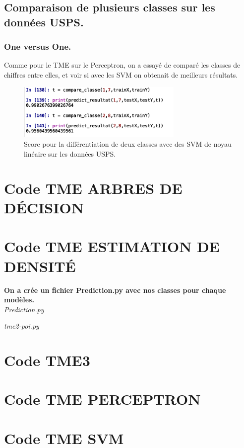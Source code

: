 \documentclass{article}
\begin{document}
\subsection{Comparaison de plusieurs classes sur les données USPS.}
\subsubsection{One versus One.}
Comme pour le TME sur le Perceptron, on a essayé de comparé les classes de chiffres entre elles, et voir si avec les SVM on obtenait de meilleurs résultats.\\
\begin{figure}[h]
	\center
	\includegraphics[width=8cm]{figure/tme6/oneversusall.png} 
	 \caption{Score pour la différentiation de deux classes avec des SVM de noyau linéaire sur les données USPS. }
	 
\end{figure}
\clearpage
\appendix
\section{Code TME ARBRES DE DÉCISION}

\clearpage
\section{Code TME ESTIMATION DE DENSITÉ}
\textbf{On a crée un fichier Prediction.py avec nos classes pour chaque modèles.}\\
\textit{Prediction.py}

\textit{tme2-poi.py}

\clearpage
\section{Code TME3}
%
\clearpage
\section{Code TME PERCEPTRON}

\clearpage
\section{Code TME SVM}

\end{document}
